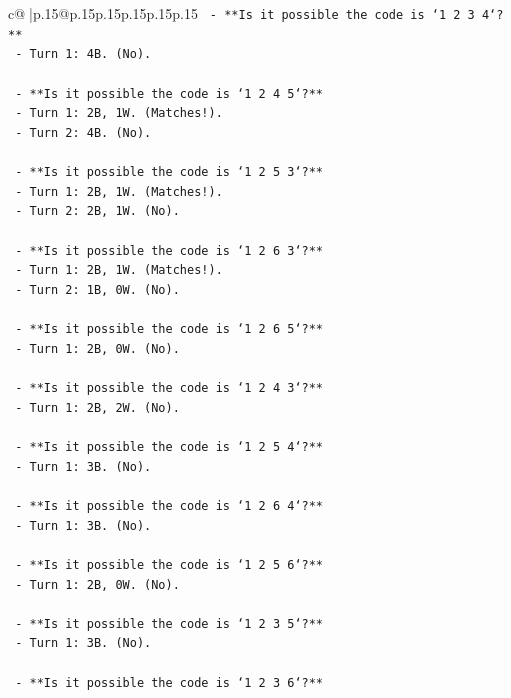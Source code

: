 \documentclass{article}
\begin{document}
{\begin{supertabular}{c@{$\;$}|p{.15\linewidth}@{}p{.15\linewidth}p{.15\linewidth}p{.15\linewidth}p{.15\linewidth}p{.15\linewidth}}
{{{\texttt{    {-} **Is it possible the code is `1 2 3 4`?**} \\
\texttt{        {-} Turn 1: 4B. (No).} \\
\\ 
\texttt{    {-} **Is it possible the code is `1 2 4 5`?**} \\
\texttt{        {-} Turn 1: 2B, 1W. (Matches!).} \\
\texttt{        {-} Turn 2: 4B. (No).} \\
\\ 
\texttt{    {-} **Is it possible the code is `1 2 5 3`?**} \\
\texttt{        {-} Turn 1: 2B, 1W. (Matches!).} \\
\texttt{        {-} Turn 2: 2B, 1W. (No).} \\
\\ 
\texttt{    {-} **Is it possible the code is `1 2 6 3`?**} \\
\texttt{        {-} Turn 1: 2B, 1W. (Matches!).} \\
\texttt{        {-} Turn 2: 1B, 0W. (No).} \\
\\ 
\texttt{    {-} **Is it possible the code is `1 2 6 5`?**} \\
\texttt{        {-} Turn 1: 2B, 0W. (No).} \\
\\ 
\texttt{    {-} **Is it possible the code is `1 2 4 3`?**} \\
\texttt{        {-} Turn 1: 2B, 2W. (No).} \\
\\ 
\texttt{    {-} **Is it possible the code is `1 2 5 4`?**} \\
\texttt{        {-} Turn 1: 3B. (No).} \\
\\ 
\texttt{    {-} **Is it possible the code is `1 2 6 4`?**} \\
\texttt{        {-} Turn 1: 3B. (No).} \\
\\ 
\texttt{    {-} **Is it possible the code is `1 2 5 6`?**} \\
\texttt{        {-} Turn 1: 2B, 0W. (No).} \\
\\ 
\texttt{    {-} **Is it possible the code is `1 2 3 5`?**} \\
\texttt{        {-} Turn 1: 3B. (No).} \\
\\ 
\texttt{    {-} **Is it possible the code is `1 2 3 6`?**} \\
}}}
\end{supertabular}}
\end{document}
